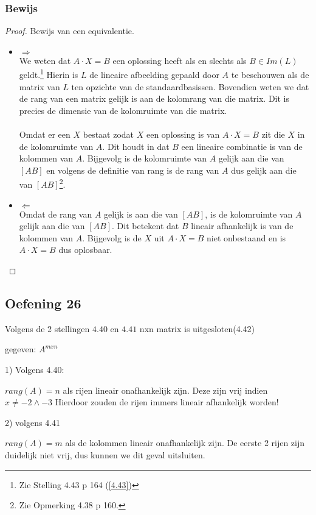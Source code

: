 \documentclass[lineaire_algebra_oplossingen.tex]{subfiles}
\begin{document}
\subsubsection*{Bewijs}
\begin{proof}
Bewijs van een equivalentie.
\begin{itemize}
\item $\Rightarrow$\\
We weten dat $A\cdot X = B$ een oplossing heeft als en slechts als $B \in Im(L)$ geldt.\footnote{Zie Stelling 4.43 p 164 (\ref{4.43})} Hierin is $L$ de lineaire afbeelding gepaald door $A$ te beschouwen als de matrix van $L$ ten opzichte van de standaardbasissen.
Bovendien weten we dat de rang van een matrix gelijk is aan de kolomrang van die matrix.
Dit is precies de dimensie van de kolomruimte van die matrix.\\\\
Omdat er een $X$ bestaat zodat $X$ een oplossing is van $A\cdot X = B$ zit die $X$ in de kolomruimte van $A$. Dit houdt in dat $B$ een lineaire combinatie is van de kolommen van $A$. Bijgevolg is de kolomruimte van $A$ gelijk aan die van $[A B]$ en volgens de definitie van rang is de rang van $A$ dus gelijk aan die van $[A B]$\footnote{Zie Opmerking 4.38 p 160.}.

\item $\Leftarrow$\\
Omdat de rang van $A$ gelijk is aan die van $[A B]$, is de kolomruimte van $A$ gelijk aan die van $[A B]$. Dit betekent dat $B$ lineair afhankelijk is van de kolommen van $A$. Bijgevolg is de $X$ uit $A\cdot X = B$ niet onbestaand en is $A\cdot X = B$ dus oplosbaar.
\end{itemize}
\end{proof}


\subsection{Oefening 26}

Volgens de 2 stellingen $4.40$ en $4.41$ nxn matrix is uitgesloten(4.42)

gegeven: $ A ^ {m x n} $

1) Volgens 4.40: 

$rang(A) = n $ als rijen lineair onafhankelijk zijn.
Deze zijn vrij indien $x \neq -2 \wedge -3$ Hierdoor zouden de rijen immers lineair afhankelijk worden! 

2) volgens 4.41

$rang(A) = m $ als de kolommen lineair onafhankelijk zijn. De eerste 2 rijen zijn duidelijk niet vrij, dus kunnen we dit geval uitsluiten.
\end{document}

